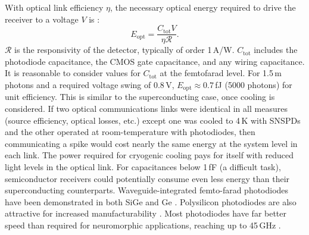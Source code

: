 \documentclass[twocolumn]{article}
\begin{document}
With optical link efficiency $\eta$, the necessary optical energy required to drive the receiver to a voltage $V$ is \cite{miller2017attojoule}:
\begin{equation}
\label{eq: semi}
    E_{\mathrm{opt}} = \frac{C_{\mathrm{tot}} V}{\eta \mathcal{R}}.
\end{equation}
$\mathcal{R}$ is the responsivity of the detector, typically of order 1\,A/W. $C_{\mathrm{tot}}$ includes the photodiode capacitance, the CMOS gate capacitance, and any wiring capacitance. It is reasonable to consider values for $C_{\mathrm{tot}}$ at the femtofarad level. For 1.5\,\textmu m photons and a required voltage swing of 0.8\,V, $E_{\mathrm{opt}} \approx 0.7 $\,fJ (5000 photons) for unit efficiency. This is similar to the superconducting case, once cooling is considered. If two optical communications links were identical in all measures (source efficiency, optical losses, etc.) except one was cooled to 4\,K with SNSPDs and the other operated at room-temperature with photodiodes, then communicating a spike would cost nearly the same energy at the system level in each link. The power required for cryogenic cooling pays for itself with reduced light levels in the optical link. For capacitances below 1\,fF (a difficult task), semiconductor receivers could potentially consume even less energy than their superconducting counterparts. Waveguide-integrated femto-farad photodiodes have been demonstrated in both SiGe and Ge \cite{derose2011ultra}. Polysilicon photodiodes are also attractive for increased manufacturability \cite{meor2014}. Most photodiodes have far better speed than required for neuromorphic applications, reaching up to 45\,GHz \cite{derose2011ultra}.
\end{document}
